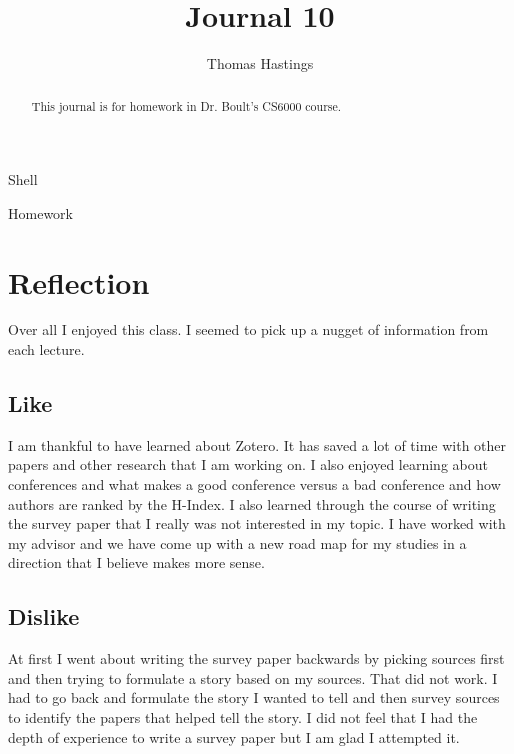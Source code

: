 \documentclass[journal]{IEEEtran}
\begin{document}
  \title{Journal 10}
  \author{Thomas Hastings}%
  
  {Shell}
  \maketitle
  
  \begin{abstract}
  This journal is for homework in Dr. Boult's CS6000 course.
  \end{abstract}
  
  \begin{IEEEkeywords}
  Homework
  \end{IEEEkeywords}
  
  
  \section{Reflection}
Over all I enjoyed this class. I seemed to pick up a nugget of information from each lecture. 
\subsection{Like}
I am thankful to have learned about Zotero. It has saved a lot of time with other papers and other research that I am working on. I also enjoyed learning about conferences and what makes a good conference versus a bad conference and how authors are ranked by the H-Index. I also learned through the course of writing the survey paper that I really was not interested in my topic. I have worked with my advisor and we have come up with a new road map for my studies in a direction that I believe makes more sense. 

\subsection{Dislike}
At first I went about writing the survey paper backwards by picking sources first and then trying to formulate a story based on my sources. That did not work. I had to go back and formulate the story I wanted to tell and then survey sources to identify the papers that helped tell the story. I did not feel that I had the depth of experience to write a survey paper but I am glad I attempted it.

  
  
\end{document}
